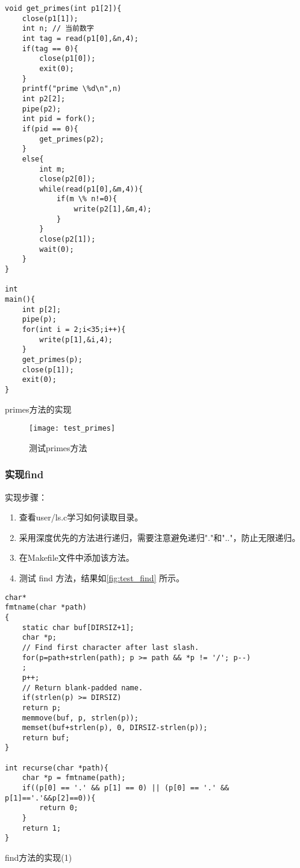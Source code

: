 \begin{listing}[!htb]
	\begin{verbatim}
void get_primes(int p1[2]){
    close(p1[1]);
    int n; // 当前数字
    int tag = read(p1[0],&n,4);
    if(tag == 0){
        close(p1[0]);
        exit(0);
    }
    printf("prime \%d\n",n)
    int p2[2];
    pipe(p2);
    int pid = fork();
    if(pid == 0){
        get_primes(p2);
    }
    else{
        int m;
        close(p2[0]);
        while(read(p1[0],&m,4)){
            if(m \% n!=0){
                write(p2[1],&m,4);           
            }
        }
        close(p2[1]);
        wait(0);
    }
}

int
main(){
    int p[2];
    pipe(p);
    for(int i = 2;i<35;i++){
        write(p[1],&i,4);
    }
    get_primes(p);
    close(p[1]);
    exit(0);
}
	\end{verbatim}
	\caption{primes方法的实现}\label{lst:primes}
\end{listing}

\begin{figure}[!htb]
	\centering
	\texttt{[image: test\_primes]}
	\caption{测试primes方法}
	\label{fig:test_primes}
\end{figure}

\subsubsection{实现find}

实现步骤：
\begin{enumerate}
	\item 查看user/ls.c学习如何读取目录。
	\item 采用深度优先的方法进行递归，需要注意避免递归"."和".."，防止无限递归。
	\item 在Makefile文件中添加该方法。
	\item 测试 find 方法，结果如\cref{fig:test_find} 所示。
\end{enumerate}

\begin{listing}[!htb]
	\begin{verbatim}
char*
fmtname(char *path)
{
    static char buf[DIRSIZ+1];
    char *p;
    // Find first character after last slash.
    for(p=path+strlen(path); p >= path && *p != '/'; p--)
    ;
    p++;
    // Return blank-padded name.
    if(strlen(p) >= DIRSIZ)
    return p;
    memmove(buf, p, strlen(p));
    memset(buf+strlen(p), 0, DIRSIZ-strlen(p));
    return buf;
}

int recurse(char *path){
    char *p = fmtname(path);
    if((p[0] == '.' && p[1] == 0) || (p[0] == '.' && p[1]=='.'&&p[2]==0)){
        return 0;
    }
    return 1;
}
	\end{verbatim}
	\caption{find方法的实现(1)}\label{lst:find1}
\end{listing}

